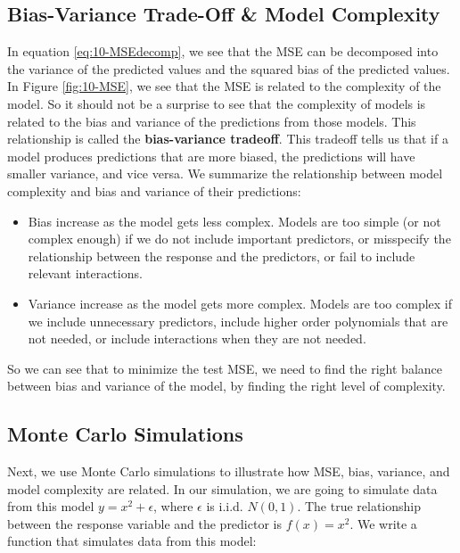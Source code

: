 \documentclass[
]{book}
\begin{document}
\hypertarget{bias-variance-trade-off-model-complexity}{%
\subsection{Bias-Variance Trade-Off \& Model Complexity}\label{bias-variance-trade-off-model-complexity}}

In equation \eqref{eq:10-MSEdecomp}, we see that the MSE can be decomposed into the variance of the predicted values and the squared bias of the predicted values. In Figure \ref{fig:10-MSE}, we see that the MSE is related to the complexity of the model. So it should not be a surprise to see that the complexity of models is related to the bias and variance of the predictions from those models. This relationship is called the \textbf{bias-variance tradeoff}. This tradeoff tells us that if a model produces predictions that are more biased, the predictions will have smaller variance, and vice versa. We summarize the relationship between model complexity and bias and variance of their predictions:

\begin{itemize}
\item
  Bias increase as the model gets less complex. Models are too simple (or not complex enough) if we do not include important predictors, or misspecify the relationship between the response and the predictors, or fail to include relevant interactions.
\item
  Variance increase as the model gets more complex. Models are too complex if we include unnecessary predictors, include higher order polynomials that are not needed, or include interactions when they are not needed.
\end{itemize}

So we can see that to minimize the test MSE, we need to find the right balance between bias and variance of the model, by finding the right level of complexity.

\hypertarget{monte-carlo-simulations}{%
\subsection{Monte Carlo Simulations}\label{monte-carlo-simulations}}

Next, we use Monte Carlo simulations to illustrate how MSE, bias, variance, and model complexity are related. In our simulation, we are going to simulate data from this model \(y = x^2 + \epsilon\), where \(\epsilon\) is i.i.d. \(N(0,1)\). The true relationship between the response variable and the predictor is \(f(x) = x^2\). We write a function that simulates data from this model:
\end{document}
